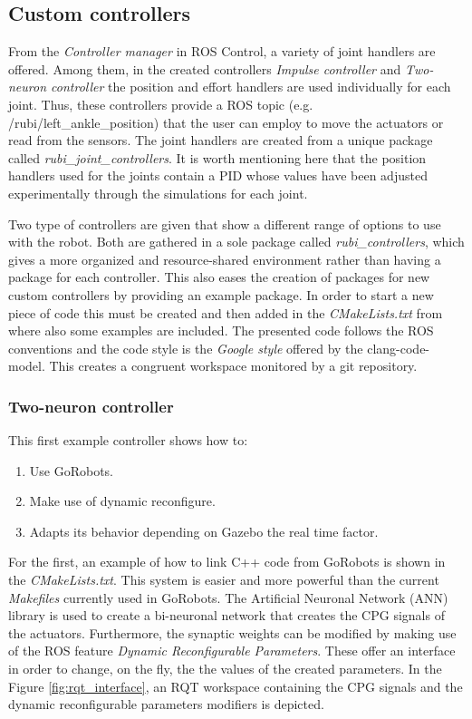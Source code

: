 
\subsection{Custom controllers} %
\label{sub:example_controllers}
From the \textit{Controller manager} in ROS Control, a variety of joint handlers are offered.
Among them, in the created controllers \textit{Impulse controller} and \textit{Two-neuron controller} the position and effort handlers are used individually for each joint.
Thus, these controllers provide a ROS topic (e.g. /rubi/left\_ankle\_position) that the user can employ to move the actuators or read from the sensors.
The joint handlers are created from a unique package called \textit{rubi\_joint\_controllers}.
It is worth mentioning here that the position handlers used for the joints contain a PID whose values have been adjusted experimentally through the simulations for each joint.

Two type of controllers are given that show a different range of options to use with the robot.
Both are gathered in a sole package called \textit{rubi\_controllers}, which gives a more organized and resource-shared environment rather than having a package for each controller.
This also eases the creation of packages for new custom controllers by providing an example package.
In order to start a new piece of code this must be created and then added in the \textit{CMakeLists.txt} from where also some examples are included.
The presented code follows the ROS conventions and the code style is the \textit{Google style} offered by the clang-code-model.
This creates a congruent workspace monitored by a git repository.

\subsubsection{Two-neuron controller} %
\label{ssub:two_neuron_controller}
This first example controller shows how to:
\begin{enumerate}
    \item Use GoRobots.
    \item Make use of dynamic reconfigure.
    \item Adapts its behavior depending on Gazebo the real time factor.
\end{enumerate}
For the first, an example of how to link C++ code from GoRobots is shown in the \textit{CMakeLists.txt}.
This system is easier and more powerful than the current \textit{Makefiles} currently used in GoRobots.
The Artificial Neuronal Network (ANN) library is used to create a bi-neuronal network that creates the CPG signals of the actuators.
Furthermore, the synaptic weights can be modified by making use of the ROS feature \textit{Dynamic Reconfigurable Parameters}.
These offer an interface in order to change, on the fly, the the values of the created parameters.
In the Figure \ref{fig:rqt_interface}, an RQT workspace containing the CPG signals and the dynamic reconfigurable parameters modifiers is depicted.

